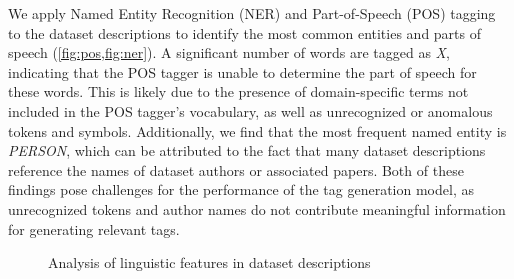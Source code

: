 We apply Named Entity Recognition (NER) and Part-of-Speech (POS) tagging to the dataset descriptions to identify the most common entities and parts of speech (\cref{fig:pos,fig:ner}). A significant number of words are tagged as \textit{X}, indicating that the POS tagger is unable to determine the part of speech for these words. This is likely due to the presence of domain-specific terms not included in the POS tagger's vocabulary, as well as unrecognized or anomalous tokens and symbols. Additionally, we find that the most frequent named entity is \textit{PERSON}, which can be attributed to the fact that many dataset descriptions reference the names of dataset authors or associated papers. Both of these findings pose challenges for the performance of the tag generation model, as unrecognized tokens and author names do not contribute meaningful information for generating relevant tags.



\begin{figure}[h]
    \centering
    \hfill
    \caption{Analysis of linguistic features in dataset descriptions}
    \label{fig:linguistic_features}
\end{figure}

